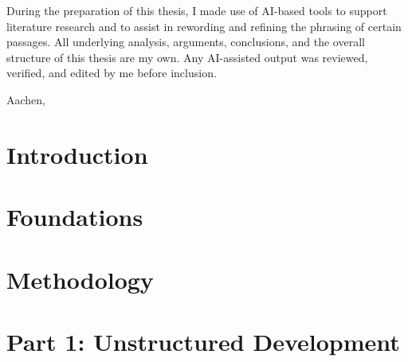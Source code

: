 \documentclass[
  draft=false,
  openany,
  english,
  fontsize=12pt,
  paper=a4,
  twoside=false,
  parskip=half,
  sfdefaults=false,
  titlepage=true,
  toc=flat,
  toc=chapterentrywithdots,
  toc=sectionentrywithdots,
  bibliography=totoc,
  captions=nooneline,
  captions=tablebelow,
  chapterprefix=false,
  headings=normal
]{scrbook}
\newcommand{\abgabedatum}{}
\begin{document}
During the preparation of this thesis, I made use of AI-based tools to support literature
research and to assist in rewording and refining the phrasing of certain passages.
All underlying analysis, arguments, conclusions, and the overall structure of this thesis
are my own. Any AI-assisted output was reviewed, verified, and edited by me before
inclusion.

Aachen, \abgabedatum

\thispagestyle{empty}
\clearpage

\tableofcontents
\clearpage

\chapter{Introduction}





\chapter{Foundations}









\chapter{Methodology}




\chapter{Part 1: Unstructured Development}








\end{document}

